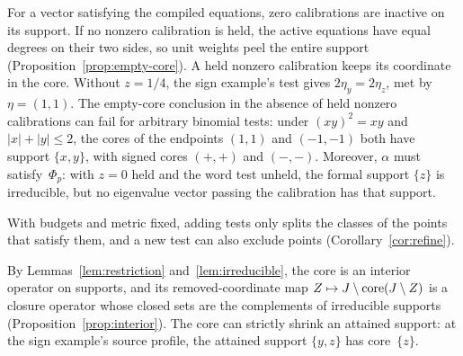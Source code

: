 For a vector satisfying the compiled equations, zero calibrations are
inactive on its support. If no nonzero calibration is held, the active
equations have equal degrees on their two sides, so unit weights peel the
entire support (Proposition~\ref{prop:empty-core}). A held nonzero
calibration keeps its coordinate in the core. Without
$z=1/4$, the sign example's test gives $2\eta_y=2\eta_z$, met by
$\eta=(1,1)$.
The empty-core conclusion in the absence of held nonzero calibrations can
fail for arbitrary binomial tests: under
$(xy)^2=xy$ and $|x|+|y|\le2$, the cores of the endpoints $(1,1)$ and
$(-1,-1)$ both have support $\{x,y\}$, with signed cores $(+,+)$ and
$(-,-)$. Moreover, $\alpha$ must satisfy~$\Phi_p$: with $z=0$ held and
the word test unheld, the formal support $\{z\}$ is irreducible, but no
eigenvalue vector passing the calibration has that support.

With budgets and metric fixed, adding tests only splits the classes of the
points that satisfy them, and a new test can also exclude points
(Corollary~\ref{cor:refine}).

By Lemmas~\ref{lem:restriction} and~\ref{lem:irreducible}, the core is
an interior operator on supports, and its removed-coordinate map
$Z\mapsto J\setminus\operatorname{core}(J\setminus Z)$ is a closure operator whose
closed sets are the complements of irreducible supports
(Proposition~\ref{prop:interior}). The core can strictly shrink an
attained support: at the sign example's source profile, the attained
support $\{y,z\}$ has core~$\{z\}$.
